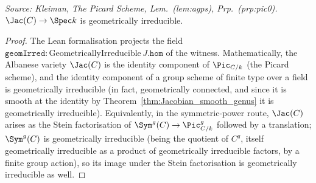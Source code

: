 \begin{theorem}
  \label{thm:Jacobian_geomIrred}
  \textit{Source: Kleiman, The Picard Scheme, Lem.~(lem:agps), Prp.~(prp:pic0).}
  \(\Jac(C) \to \Spec k\) is geometrically irreducible.
\end{theorem}
\begin{proof}

\leanok
  The Lean formalisation projects the field \(\mathtt{geomIrred} : \mathrm{GeometricallyIrreducible}\, J.\mathtt{hom}\) of the witness.
  Mathematically, the Albanese variety \(\Jac(C)\) is the identity component of \(\Pic_{C/k}\) (the Picard scheme), and the identity component of a group scheme of finite type over a field is geometrically irreducible (in fact, geometrically connected, and since it is smooth at the identity by Theorem~\ref{thm:Jacobian_smooth_genus} it is geometrically irreducible). Equivalently, in the symmetric-power route, \(\Jac(C)\) arises as the Stein factorisation of \(\Sym^g(C) \to \Pic^g_{C/k}\) followed by a translation; \(\Sym^g(C)\) is geometrically irreducible (being the quotient of \(C^g\), itself geometrically irreducible as a product of geometrically irreducible factors, by a finite group action), so its image under the Stein factorisation is geometrically irreducible as well.
\end{proof}
